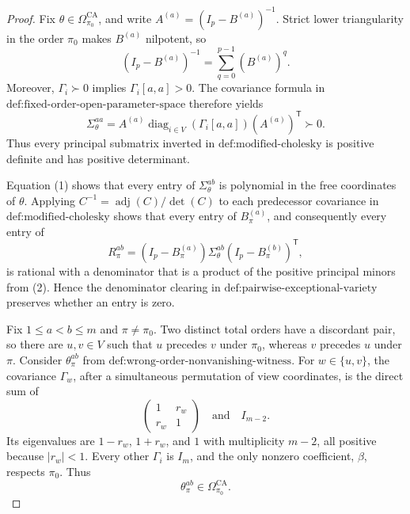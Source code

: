 \documentclass{article}
\begin{document}
\begin{proof}
Fix \(\theta\in\Omega_{\pi_0}^{\mathrm{CA}}\), and write \(A^{(a)}=(I_p-B^{(a)})^{-1}\).  Strict lower triangularity in the order \(\pi_0\) makes \(B^{(a)}\) nilpotent, so
\[
(I_p-B^{(a)})^{-1}=\sum_{q=0}^{p-1}(B^{(a)})^q.
\tag{1}
\]
Moreover, \(\Gamma_i\succ0\) implies \(\Gamma_i[a,a]>0\).  The covariance formula in \(\text{def:fixed-order-open-parameter-space}\) therefore yields
\[
\Sigma_\theta^{aa}
=A^{(a)}\operatorname{diag}_{i\in V}(\Gamma_i[a,a])(A^{(a)})^{\mathsf T}
\succ0.
\tag{2}
\]
Thus every principal submatrix inverted in \(\text{def:modified-cholesky}\) is positive definite and has positive determinant.

Equation (1) shows that every entry of \(\Sigma_\theta^{ab}\) is polynomial in the free coordinates of \(\theta\).  Applying
\(C^{-1}=\operatorname{adj}(C)/\det(C)\) to each predecessor covariance in \(\text{def:modified-cholesky}\) shows that every entry of \(B_\pi^{(a)}\), and consequently every entry of
\[
R_\pi^{ab}=(I_p-B_\pi^{(a)})\Sigma_\theta^{ab}
(I_p-B_\pi^{(b)})^{\mathsf T},
\tag{3}
\]
is rational with a denominator that is a product of the positive principal minors from (2).  Hence the denominator clearing in \(\text{def:pairwise-exceptional-variety}\) preserves whether an entry is zero.

Fix \(1\le a<b\le m\) and \(\pi\ne\pi_0\).  Two distinct total orders have a discordant pair, so there are \(u,v\in V\) such that \(u\) precedes \(v\) under \(\pi_0\), whereas \(v\) precedes \(u\) under \(\pi\).  Consider \(\theta_\pi^{ab}\) from \(\text{def:wrong-order-nonvanishing-witness}\).  For \(w\in\{u,v\}\), the covariance \(\Gamma_w\), after a simultaneous permutation of view coordinates, is the direct sum of
\[
\begin{pmatrix}1&r_w\\ r_w&1\end{pmatrix}
\quad\text{and}\quad I_{m-2}.
\]
Its eigenvalues are \(1-r_w\), \(1+r_w\), and \(1\) with multiplicity \(m-2\), all positive because \(|r_w|<1\).  Every other \(\Gamma_i\) is \(I_m\), and the only nonzero coefficient, \(\beta\), respects \(\pi_0\).  Thus
\[
\theta_\pi^{ab}\in\Omega_{\pi_0}^{\mathrm{CA}}.
\tag{4}
\]


\end{proof}
\end{document}
